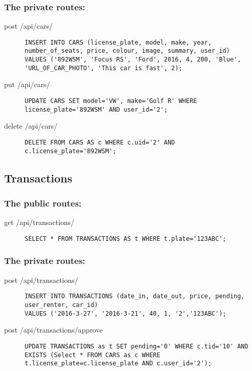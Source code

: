 \documentclass{article}
\begin{document}
\subsubsection{The private routes:}
\begin{description}
\item[post /api/cars/] \mbox{}
\begin{lstlisting}
INSERT INTO CARS (license_plate, model, make, year, number_of_seats, price, colour, image, summary, user_id)
VALUES ('892WSM', 'Focus RS', 'Ford', 2016, 4, 200, 'Blue', 'URL_OF_CAR_PHOTO', 'This car is fast', 2);
\end{lstlisting}
\item[put /api/cars/] \mbox{}
\begin{lstlisting}
UPDATE CARS SET model='VW', make='Golf R' WHERE license_plate='892WSM' AND user_id='2';
\end{lstlisting}
\item[delete /api/cars/] \mbox{}
\begin{lstlisting}
DELETE FROM CARS AS c WHERE c.uid='2' AND c.license_plate='892WSM';
\end{lstlisting}
\end{description}

\subsection{Transactions}
\subsubsection{The public routes:}
\begin{description}
\item[get /api/transactions/] \mbox{}
\begin{lstlisting}
SELECT * FROM TRANSACTIONS AS t WHERE t.plate='123ABC';
\end{lstlisting}
\end{description}

\subsubsection{The private routes:}
\begin{description}
\item[post /api/transactions/] \mbox{}
\begin{lstlisting}
INSERT INTO TRANSACTIONS (date_in, date_out, price, pending, user_renter, car_id)
VALUES ('2016-3-27', '2016-3-21', 40, 1, '2','123ABC');
\end{lstlisting}
\item[post /api/transactions/approve] \mbox{}
\begin{lstlisting}
UPDATE TRANSACTIONS as t SET pending='0' WHERE c.tid='10' AND EXISTS (Select * FROM CARS as c WHERE t.license_plate=c.license_plate AND c.user_id='2');
\end{lstlisting}
\end{description}
\end{document}
